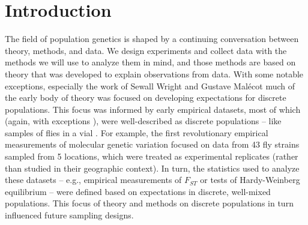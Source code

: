 \documentclass{ar-1col}
\begin{document}
\section{Introduction}

The field of population genetics is shaped by a continuing conversation
between theory, methods, and data.
We design experiments and collect data
with the methods we will use to analyze them in mind, 
and those methods are based on theory
that was developed to explain observations from data.
With some notable exceptions,
especially the work of Sewall Wright \citep{Wright1940,Wright1943,wright1946isolation}
and Gustave Mal\'ecot \citep{malecot}
much of the early body of theory was focused on
developing expectations for discrete populations.
This focus was informed by early empirical datasets,
most of which
(again, with exceptions \citet[e.g.,][]{Dobzhansky_Wright1943, dobzhansky1947}),
were well-described as discrete populations --
like samples of flies in a vial \citep{lewontin1974}.
For example, 
the first revolutionary empirical measurements
of molecular genetic variation \citep{HubbyLewontin66,LewontinHubby66}
focused on data from 43 fly strains sampled from 5 locations,
which were treated as experimental replicates
(rather than studied in their geographic context).
In turn, 
the statistics used to analyze these datasets --
e.g., empirical measurements of $F_{ST}$ \citep{Wright1951}
or tests of Hardy-Weinberg equilibrium \citep{hardy1908,weinberg1908} --
were defined based on expectations in discrete, well-mixed populations.
This focus of theory and methods on discrete populations in turn influenced
future sampling designs.
\end{document}
